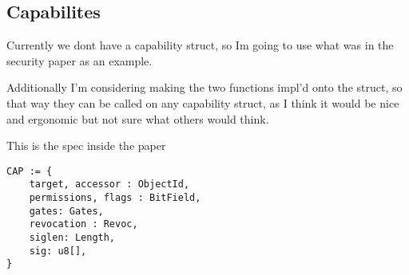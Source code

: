 \documentclass{article}
\begin{document}
\subsection{Capabilites}

Currently we dont have a capability struct, so Im going to use
what was in the security paper as an example.

Additionally I'm considering making the two functions impl'd onto the struct,
so that way they can be called on any capability struct, as I think it would
be nice and ergonomic but not sure what others would think.

This is the spec inside the paper

\begin{verbatim}
CAP := {
    target, accessor : ObjectId,
    permissions, flags : BitField,
    gates: Gates,
    revocation : Revoc,
    siglen: Length,
    sig: u8[],
}
\end{verbatim}
\end{document}
